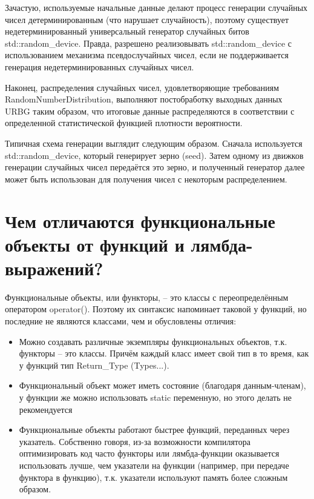 \documentclass[a4paper,12pt]{article}	%
\begin{document}
	Зачастую, используемые начальные данные делают процесс генерации случайных чисел детерминированным (что нарушает случайность), поэтому существует недетерминированный универсальный генератор случайных битов std::random\_device. Правда, разрешено реализовывать std::random\_device с использованием механизма псевдослучайных чисел, если не поддерживается генерация недетерминированных случайных чисел.
	
	Наконец, распределения случайных чисел, удовлетворяющие требованиям RandomNumberDistribution, выполняют постобработку выходных данных URBG таким образом, что итоговые данные распределяются в соответствии с определенной статистической функцией плотности вероятности.
	
	Типичная схема генерации выглядит следующим образом. Сначала используется std::random\_device, который генерирует зерно (seed). Затем одному из движков генерации случайных чисел передаётся это зерно, и полученный генератор далее может быть использован для получения чисел с некоторым распределением.
	
\section{Чем отличаются функциональные объекты от функций и лямбда-выражений?}		
	Функциональные объекты, или функторы, -- это классы с переопределённым оператором operator().  Поэтому их синтаксис напоминает таковой у функций, но последние не являются классами, чем и обусловлены отличия:
	
	\begin{itemize}
	
		\item Можно создавать различные экземпляры функциональных объектов, т.к. функторы -- это классы. Причём каждый класс имеет свой тип в то время, как у функций тип Return\_Type (Types...). 	
	
		\item Функциональный объект может иметь состояние (благодаря данным-членам), у функции же можно использовать static переменную, но этого делать не рекомендуется
		
		\item Функциональные объекты работают быстрее функций, переданных через указатель. Собственно говоря, из-за возможности компилятора оптимизировать код часто функторы или лямбда-функции оказывается использовать лучше, чем указатели на функции (например, при передаче функтора в функцию), т.к. указатели используют память более сложным образом.
	
	\end{itemize}
	
\end{document}
